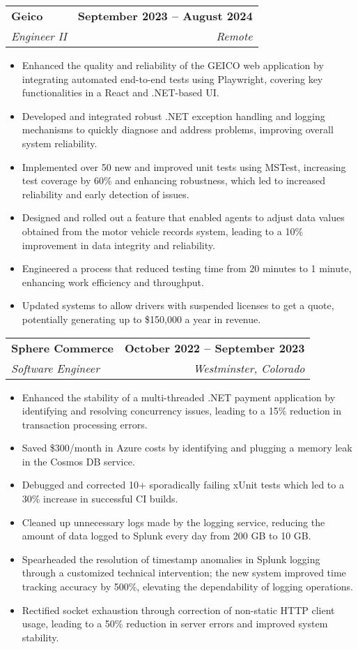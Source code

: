 \documentclass[letterpaper,11pt]{article}
\makeatletter
\newcommand{\resumeItem}[1]{
  \item\small{
    {#1 \vspace{2pt}}
  }
}
\newcommand{\resumeSubheading}[4]{
  \vspace{-2pt}\item
    \begin{tabular*}{1.0\textwidth}[t]{l@{\extracolsep{\fill}}r}
      \textbf{#1} & \textbf{\small #2} \\
      \textit{\small#3} & \textit{\small #4} \\
    \end{tabular*}\vspace{-7pt}
}
\newcommand{\resumeItemListStart}{\begin{itemize}}
\newcommand{\resumeItemListEnd}{\end{itemize}\vspace{-5pt}}
\makeatother
\begin{document}
  	\resumeSubheading
      {Geico}{September 2023 -- August 2024}
      {Engineer II}{Remote}
      \resumeItemListStart
	\resumeItem{Enhanced the quality and reliability of the GEICO web application by integrating automated end-to-end tests using Playwright, covering key functionalities in a React and .NET-based UI.}   
	\resumeItem{Developed and integrated robust .NET exception handling and logging mechanisms to quickly diagnose and address problems, improving overall system reliability.}
	\resumeItem{Implemented over 50 new and improved unit tests using MSTest, increasing test coverage by 60\% and enhancing robustness, which led to increased reliability and early detection of issues.}
	\resumeItem{Designed and rolled out a feature that enabled agents to adjust data values obtained from the motor vehicle records system, leading to a 10\% improvement in data integrity and reliability.}
	\resumeItem{Engineered a process that reduced testing time from 20 minutes to 1 minute, enhancing work efficiency and throughput.} 
	\resumeItem{Updated systems to allow drivers with suspended licenses to get a quote, potentially generating up to \$150,000 a year in revenue.}	
      \resumeItemListEnd

    \resumeSubheading
      {Sphere Commerce}{October 2022 -- September 2023}
      {Software Engineer}{Westminster, Colorado}
      \resumeItemListStart
	\resumeItem{Enhanced the stability of a multi-threaded .NET payment application by identifying and resolving concurrency issues, leading to a 15\% reduction in transaction processing errors.}
	\resumeItem{Saved \$300/month in Azure costs by identifying and plugging a memory leak in the Cosmos DB service.}
        \resumeItem{Debugged and corrected 10+ sporadically failing xUnit tests which led to a 30\% increase in successful CI builds.}
	\resumeItem{Cleaned up unnecessary logs made by the logging service, reducing the amount of data logged to Splunk every day from 200 GB to 10 GB.}
        \resumeItem{Spearheaded the resolution of timestamp anomalies in Splunk logging through a customized technical intervention; the new system improved time tracking accuracy by 500\%, elevating the dependability of logging operations. }       
	\resumeItem{Rectified socket exhaustion through correction of non-static HTTP client usage, leading to a 50\% reduction in server errors and improved system stability.}
      \resumeItemListEnd
\end{document}
